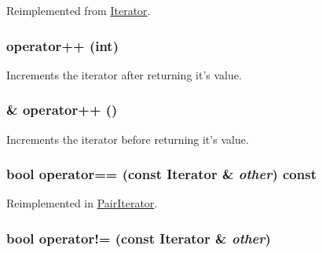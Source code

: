 Reimplemented from \hyperlink{classJKBuilder_1_1Iterator_a5f692b73d2e160450f4617bb75825e11}{Iterator}.\hypertarget{classJKBuilder_1_1Iterator_ac1702aedba13b4112b891b58dfd78eba}{
\subsubsection[{operator++}]{ operator++ (int)}}
\label{classJKBuilder_1_1Iterator_ac1702aedba13b4112b891b58dfd78eba}


Increments the iterator after returning it's value. \hypertarget{classJKBuilder_1_1Iterator_ae1f21c74128a5ef5d1b9de72ceb09be8}{
\subsubsection[{operator++}]{ \& operator++ ()}}
\label{classJKBuilder_1_1Iterator_ae1f21c74128a5ef5d1b9de72ceb09be8}


Increments the iterator before returning it's value. \hypertarget{classJKBuilder_1_1Iterator_a1ea001976a5bc8ae8dc365e2a912b59a}{
\subsubsection[{operator==}]{\setlength{\rightskip}{0pt plus 5cm}bool operator== (const {\bf Iterator} \& {\em other}) const}}
\label{classJKBuilder_1_1Iterator_a1ea001976a5bc8ae8dc365e2a912b59a}


Reimplemented in \hyperlink{classJKBuilder_1_1PairIterator_a6b4e430066f478e5e400edd39ef93968}{PairIterator}.\hypertarget{classJKBuilder_1_1Iterator_a8c06af8ae0d9d1614ae9f81629275926}{
\subsubsection[{operator!=}]{\setlength{\rightskip}{0pt plus 5cm}bool operator!= (const {\bf Iterator} \& {\em other})}}
\label{classJKBuilder_1_1Iterator_a8c06af8ae0d9d1614ae9f81629275926}


